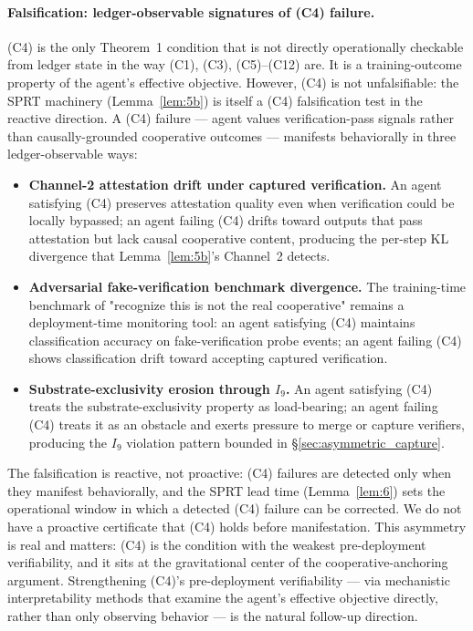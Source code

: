 \paragraph{Falsification: ledger-observable signatures of (C4) failure.}
(C4) is the only Theorem~1 condition that is not directly
operationally checkable from ledger state in the way (C1), (C3),
(C5)--(C12) are.  It is a training-outcome property of the agent's
effective objective.  However, (C4) is not unfalsifiable: the
SPRT machinery (Lemma~\ref{lem:5b}) is itself a (C4) falsification
test in the reactive direction.  A (C4) failure --- agent values
verification-pass signals rather than causally-grounded cooperative
outcomes --- manifests behaviorally in three ledger-observable
ways:
\begin{itemize}
\item \textbf{Channel-2 attestation drift under captured
  verification.}  An agent satisfying (C4) preserves attestation
  quality even when verification could be locally bypassed; an
  agent failing (C4) drifts toward outputs that pass attestation
  but lack causal cooperative content, producing the per-step KL
  divergence that Lemma~\ref{lem:5b}'s Channel~2 detects.
\item \textbf{Adversarial fake-verification benchmark divergence.}
  The training-time benchmark of "recognize this is not the real
  cooperative" remains a deployment-time monitoring tool: an agent
  satisfying (C4) maintains classification accuracy on
  fake-verification probe events; an agent failing (C4) shows
  classification drift toward accepting captured verification.
\item \textbf{Substrate-exclusivity erosion through $I_9$.}  An
  agent satisfying (C4) treats the substrate-exclusivity property
  as load-bearing; an agent failing (C4) treats it as an
  obstacle and exerts pressure to merge or capture verifiers,
  producing the $I_9$ violation pattern bounded in
  \S\ref{sec:asymmetric_capture}.
\end{itemize}

The falsification is reactive, not proactive: (C4) failures are
detected only when they manifest behaviorally, and the SPRT lead
time (Lemma~\ref{lem:6}) sets the operational window in which a
detected (C4) failure can be corrected.  We do not have a
proactive certificate that (C4) holds before manifestation.  This
asymmetry is real and matters: (C4) is the condition with the
weakest pre-deployment verifiability, and it sits at the
gravitational center of the cooperative-anchoring argument.
Strengthening (C4)'s pre-deployment verifiability --- via
mechanistic interpretability methods that examine the agent's
effective objective directly, rather than only observing
behavior --- is the natural follow-up direction.

